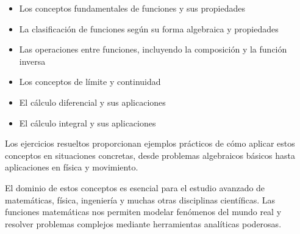 \documentclass[12pt, a4paper, oneside]{book}
\theoremstyle{definition}
\begin{document}
\begin{itemize}
    \item Los conceptos fundamentales de funciones y sus propiedades
    \item La clasificación de funciones según su forma algebraica y propiedades
    \item Las operaciones entre funciones, incluyendo la composición y la función inversa
    \item Los conceptos de límite y continuidad
    \item El cálculo diferencial y sus aplicaciones
    \item El cálculo integral y sus aplicaciones
\end{itemize}

Los ejercicios resueltos proporcionan ejemplos prácticos de cómo aplicar estos conceptos en situaciones concretas, desde problemas algebraicos básicos hasta aplicaciones en física y movimiento.

El dominio de estos conceptos es esencial para el estudio avanzado de matemáticas, física, ingeniería y muchas otras disciplinas científicas. Las funciones matemáticas nos permiten modelar fenómenos del mundo real y resolver problemas complejos mediante herramientas analíticas poderosas.
\end{document}
